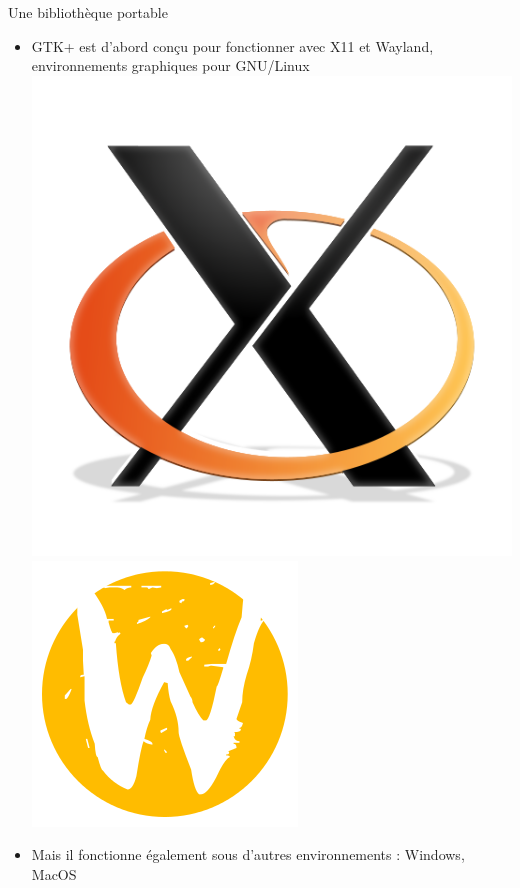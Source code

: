 \documentclass{beamer}
\begin{document}
\begin{frame}{Une bibliothèque portable}
	\begin{itemize}
	\item GTK+ est d'abord conçu pour fonctionner avec X11 et Wayland, environnements graphiques pour GNU/Linux \includegraphics[scale=0.075]{Pictures/X11.png} \includegraphics[scale=0.15]{Pictures/wayland.png} 
    \item Mais il fonctionne également sous d'autres environnements : Windows, MacOS \linebreak

\end{itemize}
\end{frame}
\end{document}
